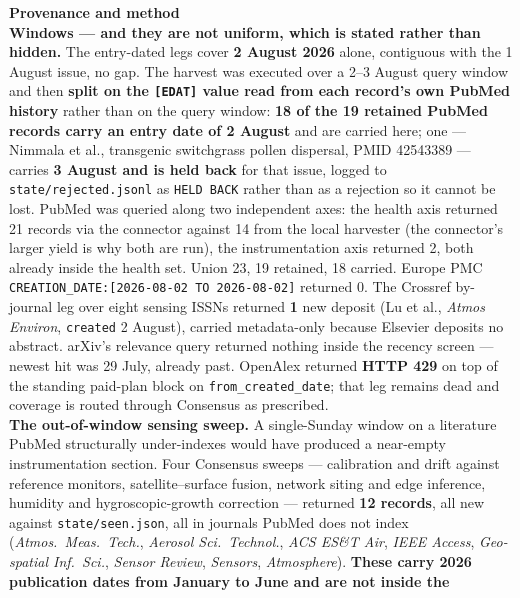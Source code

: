 \documentclass[10pt]{article}
\begin{document}
\vspace{4mm}
\begin{keybox}
{\sffamily\bfseries\footnotesize\color{Deep}Provenance and method}\\[1.2mm]
{\fontsize{7.2}{8.8}\selectfont
\textbf{Windows --- and they are not uniform, which is stated rather than hidden.}
The entry-dated legs cover \textbf{2 August 2026} alone, contiguous with the 1 August
issue, no gap. The harvest was executed over a 2--3 August query window and then
\textbf{split on the \texttt{[EDAT]} value read from each record's own PubMed history}
rather than on the query window: \textbf{18 of the 19 retained PubMed records carry an
entry date of 2 August} and are carried here; one --- Nimmala et al., transgenic
switchgrass pollen dispersal, PMID 42543389 --- carries \textbf{3 August and is held back}
for that issue, logged to \texttt{state/rejected.jsonl} as \texttt{HELD BACK} rather than
as a rejection so it cannot be lost. PubMed was queried along two independent axes: the
health axis returned 21 records via the connector against 14 from the local harvester
(the connector's larger yield is why both are run), the instrumentation axis returned 2,
both already inside the health set. Union 23, 19 retained, 18 carried. Europe PMC
\texttt{CREATION\_DATE:[2026-08-02 TO 2026-08-02]} returned 0. The Crossref by-journal leg
over eight sensing ISSNs returned \textbf{1} new deposit (Lu et al., \textit{Atmos
Environ}, \texttt{created} 2 August), carried metadata-only because Elsevier deposits no
abstract. arXiv's relevance query returned nothing inside the recency screen --- newest hit
was 29 July, already past. OpenAlex returned \textbf{HTTP 429} on top of the standing
paid-plan block on \texttt{from\_created\_date}; that leg remains dead and coverage is
routed through Consensus as prescribed.
\\[1.0mm]
\textbf{The out-of-window sensing sweep.} A single-Sunday window on a literature PubMed
structurally under-indexes would have produced a near-empty instrumentation section. Four
Consensus sweeps --- calibration and drift against reference monitors, satellite--surface
fusion, network siting and edge inference, humidity and hygroscopic-growth correction ---
returned \textbf{12 records}, all new against \texttt{state/seen.json}, all in journals
PubMed does not index (\textit{Atmos.\ Meas.\ Tech.}, \textit{Aerosol Sci.\ Technol.},
\textit{ACS ES\&T Air}, \textit{IEEE Access}, \textit{Geo-spatial Inf.\ Sci.},
\textit{Sensor Review}, \textit{Sensors}, \textit{Atmosphere}).
\textbf{These carry 2026 publication dates from January to June and are not inside the
}}
\end{keybox}
\end{document}
